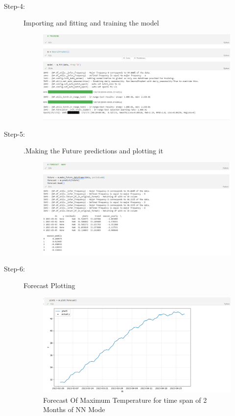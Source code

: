 \begin{description}
\pagebreak
\item[Step-4:] Importing and fitting and training the model

 \begin{figure}[hbt!]
  \centering
  \includegraphics[width=0.7\linewidth]{images/outputs/model.png}
\end{figure}


\item[Step-5:] .Making the Future predictions and plotting it

 \begin{figure}[hbt!]
  \centering
  \includegraphics[width=0.8\linewidth]{images/outputs/forecast.png}
\end{figure}

\item[Step-6:] Forecast Plotting

 \begin{figure}[hbt!]
  \centering
  \includegraphics[width=0.8\linewidth]{images/outputs/plot.png}
  \caption{Forecast Of Maximum Temperature for time span of 2 Months of NN Mode}
\end{figure}


\end{description}
